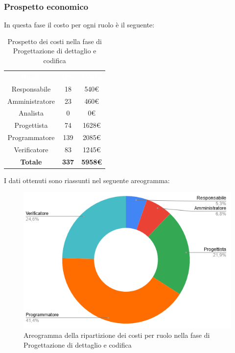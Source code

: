 \subsubsection{Prospetto economico}
In questa fase il costo per ogni ruolo è il seguente:
 
\begin{table}[H]
\centering\renewcommand{\arraystretch}{1.5}
\caption{Prospetto dei costi nella fase di Progettazione di dettaglio e codifica}
\vspace{0.2cm}
\begin{tabular}{ c | c | c  }
\rowcolor{redafk}
\textcolor{white}{\textbf{Ruolo}} & \textcolor{white}{\textbf{Ore}} &
\textcolor{white}{\textbf{Costo}}  \\
Responsabile & 18 & 540€ \\
Amministratore & 23 & 460€ \\
Analista & 0 & 0€ \\
Progettista & 74 & 1628€ \\
Programmatore & 139 & 2085€  \\
Verificatore & 83 & 1245€  \\
\rowcolor{lastrowcolor}
\textbf{Totale} & \textbf{337} & \textbf{5958€}  \\
\end{tabular}
\end{table}
 
I dati ottenuti sono riassunti nel seguente areogramma:
\begin{figure}[H]
\centering
\includegraphics[scale=0.60]{img/grafici/torta_fase_prog_cod.png}
\caption{Areogramma della ripartizione dei costi per ruolo nella fase di Progettazione di dettaglio e codifica}
\end{figure}

